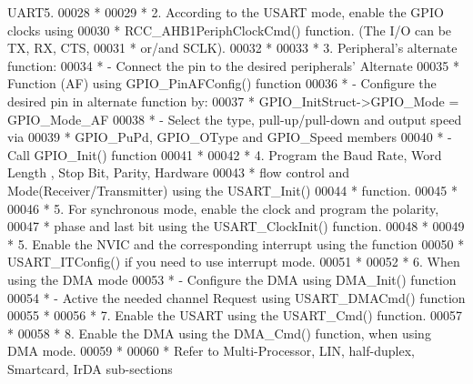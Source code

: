 \begin{DoxyCode}
{       UART5.}
00028 \textcolor{comment}{  *}
00029 \textcolor{comment}{  *          2.  According to the USART mode, enable the GPIO clocks using }
00030 \textcolor{comment}{  *              RCC\_AHB1PeriphClockCmd() function. (The I/O can be TX, RX, CTS, }
00031 \textcolor{comment}{  *              or/and SCLK). }
00032 \textcolor{comment}{  *}
00033 \textcolor{comment}{  *          3. Peripheral's alternate function: }
00034 \textcolor{comment}{  *                 - Connect the pin to the desired peripherals' Alternate }
00035 \textcolor{comment}{  *                   Function (AF) using GPIO\_PinAFConfig() function}
00036 \textcolor{comment}{  *                 - Configure the desired pin in alternate function by:}
00037 \textcolor{comment}{  *                   GPIO\_InitStruct->GPIO\_Mode = GPIO\_Mode\_AF}
00038 \textcolor{comment}{  *                 - Select the type, pull-up/pull-down and output speed via }
00039 \textcolor{comment}{  *                   GPIO\_PuPd, GPIO\_OType and GPIO\_Speed members}
00040 \textcolor{comment}{  *                 - Call GPIO\_Init() function}
00041 \textcolor{comment}{  *        }
00042 \textcolor{comment}{  *          4. Program the Baud Rate, Word Length , Stop Bit, Parity, Hardware }
00043 \textcolor{comment}{  *             flow control and Mode(Receiver/Transmitter) using the USART\_Init()}
00044 \textcolor{comment}{  *             function.}
00045 \textcolor{comment}{  *}
00046 \textcolor{comment}{  *          5. For synchronous mode, enable the clock and program the polarity,}
00047 \textcolor{comment}{  *             phase and last bit using the USART\_ClockInit() function.}
00048 \textcolor{comment}{  *}
00049 \textcolor{comment}{  *          5. Enable the NVIC and the corresponding interrupt using the function }
00050 \textcolor{comment}{  *             USART\_ITConfig() if you need to use interrupt mode. }
00051 \textcolor{comment}{  *}
00052 \textcolor{comment}{  *          6. When using the DMA mode }
00053 \textcolor{comment}{  *                   - Configure the DMA using DMA\_Init() function}
00054 \textcolor{comment}{  *                   - Active the needed channel Request using USART\_DMACmd() function}
00055 \textcolor{comment}{  * }
00056 \textcolor{comment}{  *          7. Enable the USART using the USART\_Cmd() function.}
00057 \textcolor{comment}{  * }
00058 \textcolor{comment}{  *          8. Enable the DMA using the DMA\_Cmd() function, when using DMA mode. }
00059 \textcolor{comment}{  *}
00060 \textcolor{comment}{  *          Refer to Multi-Processor, LIN, half-duplex, Smartcard, IrDA sub-sections}

\end{DoxyCode}
